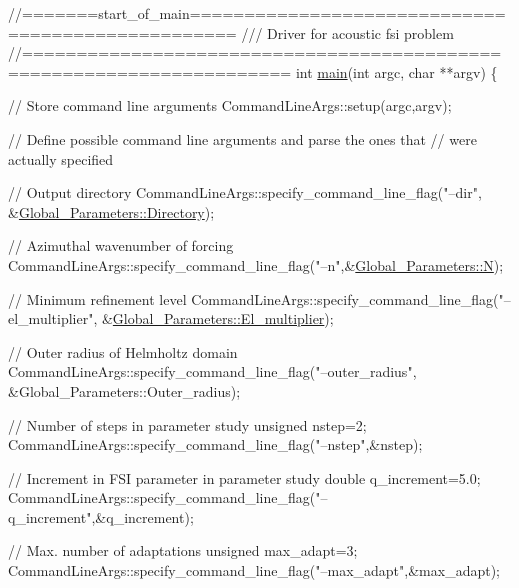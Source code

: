  
\begin{DoxyCodeInclude}
\textcolor{comment}{//=======start\_of\_main==================================================}
\textcolor{comment}{/// Driver for acoustic fsi problem}
\textcolor{comment}{}\textcolor{comment}{//======================================================================}
\textcolor{keywordtype}{int} \hyperlink{acoustic__fsi_8cc_a3c04138a5bfe5d72780bb7e82a18e627}{main}(\textcolor{keywordtype}{int} argc, \textcolor{keywordtype}{char} **argv)
\{

 \textcolor{comment}{// Store command line arguments}
 CommandLineArgs::setup(argc,argv);

 \textcolor{comment}{// Define possible command line arguments and parse the ones that}
 \textcolor{comment}{// were actually specified}
 
 \textcolor{comment}{// Output directory}
 CommandLineArgs::specify\_command\_line\_flag(\textcolor{stringliteral}{"--dir"},
                                            &\hyperlink{namespaceGlobal__Parameters_a301ab922df72030c660b21328d6caf76}{Global\_Parameters::Directory});
 
 \textcolor{comment}{// Azimuthal wavenumber of forcing}
 CommandLineArgs::specify\_command\_line\_flag(\textcolor{stringliteral}{"--n"},&\hyperlink{namespaceGlobal__Parameters_aff31353c09f439f3d537ad06ce868787}{Global\_Parameters::N});

 \textcolor{comment}{// Minimum refinement level}
 CommandLineArgs::specify\_command\_line\_flag(\textcolor{stringliteral}{"--el\_multiplier"},
                            &\hyperlink{namespaceGlobal__Parameters_a35d5d2ecfff0cec6150a5dc79e5c1ad1}{Global\_Parameters::El\_multiplier});
 
 \textcolor{comment}{// Outer radius of Helmholtz domain}
 CommandLineArgs::specify\_command\_line\_flag(\textcolor{stringliteral}{"--outer\_radius"},
                            &Global\_Parameters::Outer\_radius);
 
 \textcolor{comment}{// Number of steps in parameter study}
 \textcolor{keywordtype}{unsigned} nstep=2;
 CommandLineArgs::specify\_command\_line\_flag(\textcolor{stringliteral}{"--nstep"},&nstep);
 
 \textcolor{comment}{// Increment in FSI parameter in parameter study}
 \textcolor{keywordtype}{double} q\_increment=5.0;
 CommandLineArgs::specify\_command\_line\_flag(\textcolor{stringliteral}{"--q\_increment"},&q\_increment);
 
 \textcolor{comment}{// Max. number of adaptations}
 \textcolor{keywordtype}{unsigned} max\_adapt=3;
 CommandLineArgs::specify\_command\_line\_flag(\textcolor{stringliteral}{"--max\_adapt"},&max\_adapt);
 

\end{DoxyCodeInclude}
